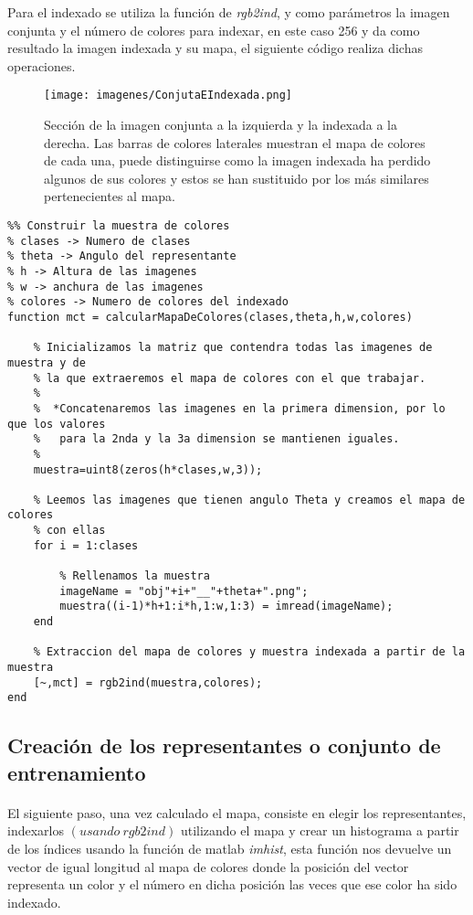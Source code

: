 \documentclass[es,gi]{ifirak}\usepackage[]{graphicx}\usepackage[]{color}
\begin{document}
Para el indexado se utiliza la función de \textit{rgb2ind}, y como parámetros la imagen conjunta y el número de colores para indexar, en este caso 256 y da como resultado la imagen indexada y su mapa, el siguiente código realiza dichas operaciones.\\

\begin{figure}[hbtp]
\centering
\texttt{[image: imagenes/ConjutaEIndexada.png]}
\caption{Sección de la imagen conjunta a la izquierda y la indexada a la derecha. Las barras de colores laterales muestran el mapa de colores de cada una, puede distinguirse como la imagen indexada ha perdido algunos de sus colores y estos se han sustituido por los más similares pertenecientes al mapa.}
\end{figure}

\begin{lstlisting}
%% Construir la muestra de colores
% clases -> Numero de clases
% theta -> Angulo del representante
% h -> Altura de las imagenes
% w -> anchura de las imagenes
% colores -> Numero de colores del indexado
function mct = calcularMapaDeColores(clases,theta,h,w,colores)

    % Inicializamos la matriz que contendra todas las imagenes de muestra y de
    % la que extraeremos el mapa de colores con el que trabajar.
    %
    %  *Concatenaremos las imagenes en la primera dimension, por lo que los valores
    %   para la 2nda y la 3a dimension se mantienen iguales.
    %
    muestra=uint8(zeros(h*clases,w,3));

    % Leemos las imagenes que tienen angulo Theta y creamos el mapa de colores
    % con ellas
    for i = 1:clases

        % Rellenamos la muestra
        imageName = "obj"+i+"__"+theta+".png";
        muestra((i-1)*h+1:i*h,1:w,1:3) = imread(imageName);
    end
    
    % Extraccion del mapa de colores y muestra indexada a partir de la muestra
    [~,mct] = rgb2ind(muestra,colores);     
end
\end{lstlisting}

\subsection{Creación de los representantes o conjunto de entrenamiento}
\paragraph{} El siguiente paso, una vez calculado el mapa, consiste en elegir los representantes, indexarlos $\left( usando\ rgb2ind \right)$ utilizando el mapa y crear un histograma a partir de los índices usando la función de matlab \textit{imhist}, esta función nos devuelve un vector de igual longitud al mapa de colores donde la posición del vector representa un color y el número en dicha posición las veces que ese color ha sido indexado.\\
\end{document}
